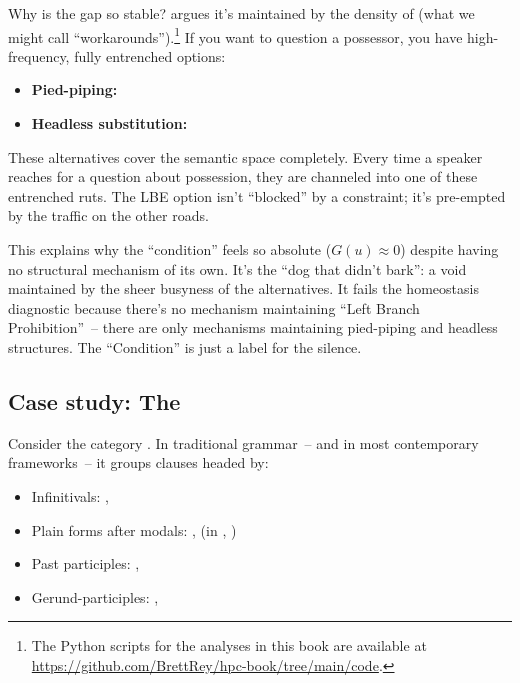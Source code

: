 Why is the gap so stable? \textcite{reynolds2026lbe} argues it's maintained by the density of  (what we might call \enquote{workarounds}).\footnote{The Python scripts for the analyses in this book are available at \url{https://github.com/BrettRey/hpc-book/tree/main/code}.} If you want to question a possessor, you have high-frequency, fully entrenched options:

\begin{itemize}
    \item \textbf{Pied-piping:} 
    \item \textbf{Headless substitution:} 
\end{itemize}

These alternatives cover the semantic space completely. Every time a speaker reaches for a question about possession, they are channeled into one of these entrenched ruts. The LBE option isn't \enquote{blocked} by a constraint; it's pre-empted by the traffic on the other roads.

This explains why the \enquote{condition} feels so absolute ($G(u) \approx 0$) despite having no structural mechanism of its own. It's the \enquote{dog that didn't bark}: a void maintained by the sheer busyness of the alternatives. It fails the homeostasis diagnostic because there's no mechanism maintaining \enquote{Left Branch Prohibition}~-- there are only mechanisms maintaining pied-piping and headless structures. The \enquote{Condition} is just a label for the silence.



\subsection{Case study: The }
\label{sec:8:non-finite}

Consider the category . In traditional grammar~-- and in most contemporary frameworks~-- it groups clauses headed by:

\begin{itemize}
    \item Infinitivals: , 
    \item Plain forms after modals: ,  (in , )
    \item Past participles: , 
    \item Gerund-participles: , 
\end{itemize}

